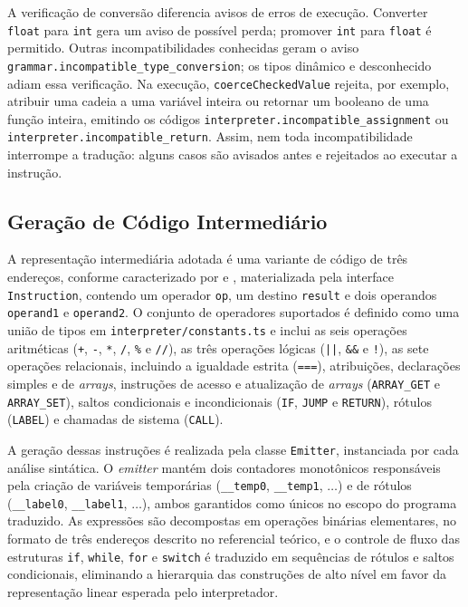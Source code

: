A verificação de conversão diferencia avisos de erros de execução. Converter \texttt{float} para \texttt{int} gera um aviso de possível perda; promover \texttt{int} para \texttt{float} é permitido. Outras incompatibilidades conhecidas geram o aviso \texttt{grammar.\allowbreak{}incompatible\_\allowbreak{}type\_\allowbreak{}conversion}; os tipos dinâmico e desconhecido adiam essa verificação. Na execução, \texttt{coerceCheckedValue} rejeita, por exemplo, atribuir uma cadeia a uma variável inteira ou retornar um booleano de uma função inteira, emitindo os códigos \texttt{interpreter.\allowbreak{}incompatible\_\allowbreak{}assignment} ou \texttt{interpreter.\allowbreak{}incompatible\_\allowbreak{}return}. Assim, nem toda incompatibilidade interrompe a tradução: alguns casos são avisados antes e rejeitados ao executar a instrução.

\subsection{Geração de Código Intermediário}
\label{subsec:geracao-codigo-intermediario}

A representação intermediária adotada é uma variante de código de três endereços, conforme caracterizado por  e , materializada pela interface \texttt{Instruction}, contendo um operador \texttt{op}, um destino \texttt{result} e dois operandos \texttt{operand1} e \texttt{operand2}. O conjunto de operadores suportados é definido como uma união de tipos em \texttt{interpreter/constants.ts} e inclui as seis operações aritméticas (\texttt{+}, \texttt{-}, \texttt{*}, \texttt{/}, \texttt{\%} e \texttt{//}), as três operações lógicas (\texttt{||}, \texttt{\&\&} e \texttt{!}), as sete operações relacionais, incluindo a igualdade estrita (\texttt{===}), atribuições, declarações simples e de \textit{arrays}, instruções de acesso e atualização de \textit{arrays} (\texttt{ARRAY\_GET} e \texttt{ARRAY\_SET}), saltos condicionais e incondicionais (\texttt{IF}, \texttt{JUMP} e \texttt{RETURN}), rótulos (\texttt{LABEL}) e chamadas de sistema (\texttt{CALL}).

A geração dessas instruções é realizada pela classe \texttt{Emitter}, instanciada por cada análise sintática. O \textit{emitter} mantém dois contadores monotônicos responsáveis pela criação de variáveis temporárias (\texttt{\_\_temp0}, \texttt{\_\_temp1}, $\ldots$) e de rótulos (\texttt{\_\_label0}, \texttt{\_\_label1}, $\ldots$), ambos garantidos como únicos no escopo do programa traduzido. As expressões são decompostas em operações binárias elementares, no formato de três endereços descrito no referencial teórico, e o controle de fluxo das estruturas \texttt{if}, \texttt{while}, \texttt{for} e \texttt{switch} é traduzido em sequências de rótulos e saltos condicionais, eliminando a hierarquia das construções de alto nível em favor da representação linear esperada pelo interpretador.

